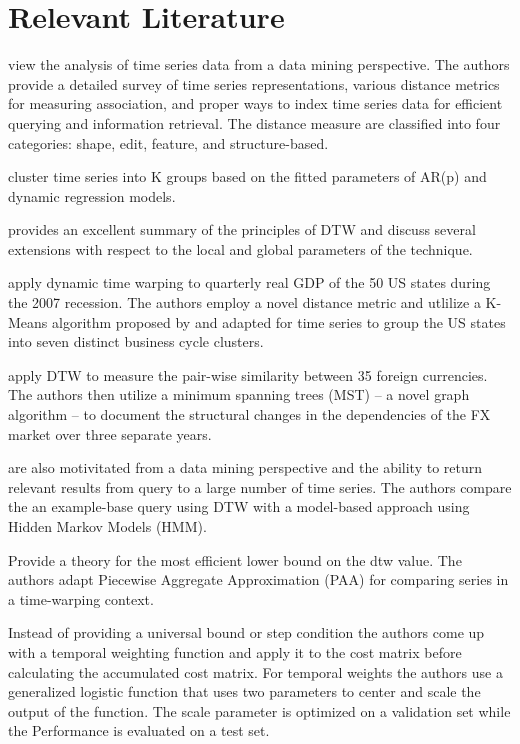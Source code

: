 \documentclass[12pt]{article}
\begin{document}
\section{Relevant Literature}

\parencite{ElsingAgon2012} view the analysis of time series data from a data mining perspective. The authors provide a detailed survey of time series representations, various distance metrics for measuring association, and proper ways to index time series data for efficient querying and information retrieval. The distance measure are classified into four categories: shape, edit, feature, and structure-based.

\parencite{FruhwirthKaufmann2004} cluster time series into K groups based on the fitted parameters of AR(p) and dynamic regression models.

\parencite{Mueller2007} provides an excellent summary of the principles of DTW and discuss several extensions with respect to the local and global parameters of the technique.

\parencite{FrancesWiemann2020} apply dynamic time warping to quarterly real GDP of the 50 US states during the 2007 recession. The authors employ a novel distance metric and utlilize a K-Means algorithm proposed by \cite{PETITJEAN2011678} and adapted for time series to group the US states into seven distinct business cycle clusters.

\parencite{WangXieHanSun2012} apply DTW to measure the pair-wise similarity between 35 foreign currencies. The authors then utilize a minimum spanning trees (MST) -- a novel graph algorithm -- to document the structural changes in the dependencies of the FX market over three separate years.

\parencite{KotsifakosAthitsosPapapetrou_2011} are also motivitated from a data mining perspective and the ability to return relevant results from query to a large number of time series. The authors compare the an example-base query using DTW with a model-based approach using Hidden Markov Models (HMM).

\parencite{KeoghRatanamahatana_2005} Provide a theory for the most efficient lower bound on the dtw value. The authors adapt Piecewise Aggregate Approximation (PAA) for comparing series in a time-warping context.

\parencite{JEONG20112231} Instead of providing a universal bound or step condition the authors come up with a temporal weighting function and apply it to the cost matrix before calculating the accumulated cost matrix. For temporal weights the authors use a generalized logistic function that uses two parameters to center and scale the output of the function. The scale parameter is optimized on a validation set while the Performance is evaluated on a test set. 
\end{document}
